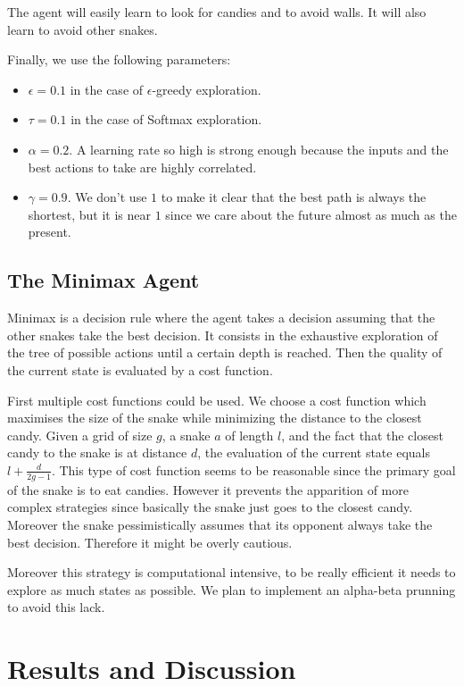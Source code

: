 \documentclass[journal, a4paper]{IEEEtran}
\begin{document}
The agent will easily learn to look for candies and to avoid walls.
It will also learn to avoid other snakes.

Finally, we use the following parameters:
\begin{itemize}
    \item $\epsilon = 0.1$ in the case of $\epsilon$-greedy exploration.
    \item $\tau = 0.1$ in the case of Softmax exploration.
    \item $\alpha = 0.2$. A learning rate so high is strong enough because the inputs and the best actions to take are highly correlated.
    \item $\gamma = 0.9$. We don't use $1$ to make it clear that the best path is always the shortest, but it is near $1$ since we care about the future almost as much as the present.
\end{itemize}

\subsection{The Minimax Agent}
Minimax is a decision rule where the agent takes a decision assuming that the other snakes take the best decision. It consists in the exhaustive exploration of the tree of possible actions until a certain depth is reached. Then the quality of the current state is evaluated by a cost function. 

First multiple cost functions could be used. We choose a cost function which maximises the size of the snake while minimizing the distance to the closest candy. Given a grid of size $g$, a snake $a$ of length $l$, and the fact that the closest candy to the snake is at distance $d$, the evaluation of the current state equals $l+\tfrac{d}{2g-1}$. This type of cost function seems to be reasonable since the primary goal of the snake is to eat candies. However it prevents the apparition of more complex strategies since basically the snake just goes to the closest candy. Moreover the snake pessimistically assumes that its opponent always take the best decision. Therefore it might be overly cautious.

Moreover this strategy is computational intensive, to be really efficient it needs to explore as much states as possible. We plan to implement an alpha-beta prunning to avoid this lack. 

\section{Results and Discussion}
\end{document}
